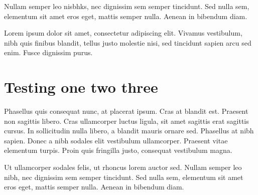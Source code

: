 Nullam semper leo nisbhks, nec dignissim sem semper tincidunt. Sed nulla sem, elementum sit amet eros eget, mattis semper nulla. Aenean in bibendum diam.

Lorem ipsum dolor sit amet, consectetur adipiscing elit. Vivamus vestibulum, nibh quis finibus blandit, tellus justo molestie nisi, sed tincidunt sapien arcu sed enim. Fusce dignissim purus. 

\section{Testing one two three}

Phasellus quis consequat nunc, at placerat ipsum. Cras at blandit est. Praesent non sagittis libero. Cras ullamcorper luctus ligula, sit amet sagittis erat sagittis cursus. In sollicitudin nulla libero, a blandit mauris ornare sed. Phasellus at nibh sapien. Donec a nibh sodales elit vestibulum ullamcorper. Praesent vitae elementum turpis. Proin quis fringilla justo, consequat vestibulum magna. 

Ut ullamcorper sodales felis, ut rhoncus lorem auctor sed. Nullam semper leo nibh, nec dignissim sem semper tincidunt. Sed nulla sem, elementum sit amet eros eget, mattis semper nulla. Aenean in bibendum diam.

\bye
